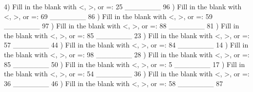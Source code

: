 \documentclass{article}%
\begin{document}
4) Fill in the blank with <, >, or =: 25 \_\_\_\_\_\_\_ 96%
\newline%
\newline%
) Fill in the blank with <, >, or =: 69 \_\_\_\_\_\_\_ 86%
\newline%
\newline%
) Fill in the blank with <, >, or =: 59 \_\_\_\_\_\_\_ 97%
\newline%
\newline%
) Fill in the blank with <, >, or =: 88 \_\_\_\_\_\_\_ 81%
\newline%
\newline%
) Fill in the blank with <, >, or =: 85 \_\_\_\_\_\_\_ 23%
\newline%
\newline%
) Fill in the blank with <, >, or =: 57 \_\_\_\_\_\_\_ 44%
\newline%
\newline%
) Fill in the blank with <, >, or =: 84 \_\_\_\_\_\_\_ 14%
\newline%
\newline%
) Fill in the blank with <, >, or =: 98 \_\_\_\_\_\_\_ 28%
\newline%
\newline%
) Fill in the blank with <, >, or =: 85 \_\_\_\_\_\_\_ 50%
\newline%
\newline%
) Fill in the blank with <, >, or =: 5 \_\_\_\_\_\_\_ 17%
\newline%
\newline%
) Fill in the blank with <, >, or =: 54 \_\_\_\_\_\_\_ 36%
\newline%
\newline%
) Fill in the blank with <, >, or =: 36 \_\_\_\_\_\_\_ 46%
\newline%
\newline%
) Fill in the blank with <, >, or =: 58 \_\_\_\_\_\_\_ 87%
\newline%
\end{document}
